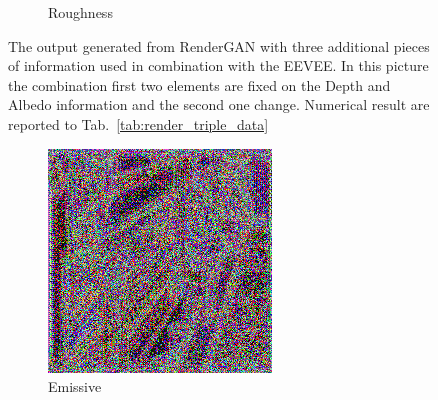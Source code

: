 \begin{figure}[h!]
\begin{subfigure}[b]{0.175\textwidth}
     \caption{Roughness}
    \end{subfigure}
    \caption[Generation Result with fixed input on Depth and Albedo]{The output generated from RenderGAN with three additional pieces of information used in combination with the EEVEE. In this picture the combination first two elements are fixed on the Depth and Albedo information and the second one change. Numerical result are reported to Tab.~\ref{tab:render_triple_data}}
    \label{fig:triple_input_base_depth_albedo}
\end{figure}

\begin{figure}[h!]
    \centering
    \begin{subfigure}[b]{0.175\textwidth}
     \includegraphics[width=\textwidth]{figures/result/triple/albedo_normal_emissive/1.png}
     \caption{Emissive}\label{subfig:1}
    \end{subfigure}
    ~
    \begin{subfigure}[b]{0.175\textwidth}

\end{subfigure}
\end{figure}
